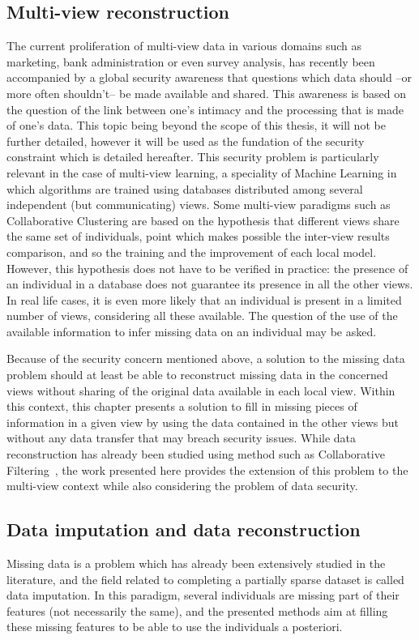 \subsection{Multi-view reconstruction}
The current proliferation of multi-view data in various domains such as 
marketing, bank administration or even survey analysis, has recently been 
accompanied by a global security awareness that questions which data should --or 
more often shouldn't-- be made available and shared. This awareness is based on 
the question of the link between one's intimacy and the processing that is made 
of one's data. This topic being beyond the scope of this thesis, it will not be 
further detailed, however it will be used as the fundation of the security 
constraint which is detailed hereafter. This security problem is particularly 
relevant in the case of multi-view learning, a speciality of Machine Learning in 
which algorithms are trained using databases distributed among several 
independent (but communicating) views. Some multi-view paradigms such as 
Collaborative Clustering are based on the hypothesis that different views share 
the same set of individuals, point which makes possible the inter-view results 
comparison, and so the training and the improvement of each local model. 
However, this hypothesis does not have to be verified in practice: the presence 
of an individual in a database does not guarantee its presence in all the other 
views. In real life cases, it is even more likely that an individual is present 
in a limited number of views, considering all these available. The question of 
the use of the available information to infer missing data on an individual may 
be asked.
	
Because of the security concern mentioned above, a solution to the missing data 
problem should at least be able to reconstruct missing data in the concerned 
views without sharing of the original data available in each local view.	
Within this context, this chapter presents a solution to fill in missing pieces 
of information in a given view by using the data contained in the other views 
but without any data transfer that may breach security issues. While data 
reconstruction has already been studied using method such as Collaborative 
Filtering~\cite{koren2015advances}, the work presented here provides the 
extension of this problem to the multi-view context while also considering the 
problem of data security.

\subsection{Data imputation and data reconstruction}
Missing data is a problem which has already been extensively studied in the
literature, and the field related to completing a partially sparse
dataset is called data imputation. In this paradigm, several individuals are 
missing part of their features (not necessarily the same), and the presented
methods aim at filling these missing features to be able to use the individuals 
a posteriori.


